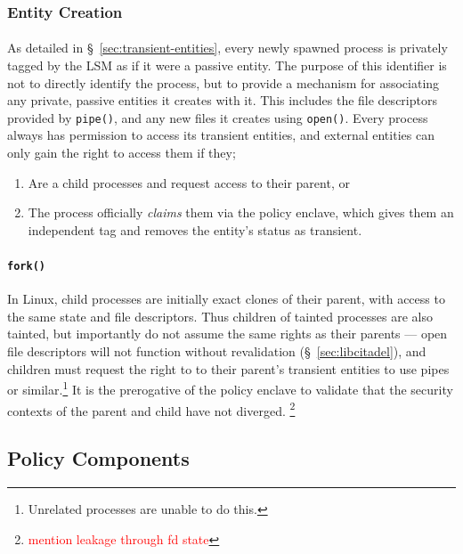 \subsubsection{Entity Creation}
\label{sec:entity-creation}
\paragraph{} As detailed in §~\ref{sec:transient-entities}, every newly spawned process is privately tagged by the LSM as if it were a passive entity. The purpose of this identifier is not to directly identify the process, but to provide a mechanism for associating any private, passive entities it creates with it. This includes the file descriptors provided by \texttt{pipe()}, and any new files it creates using \texttt{open()}. Every process always has permission to access its transient entities, and external entities can only gain the right to access them if they;
\begin{enumerate}
    \item Are a child processes and request access to their parent, or
    \item The process officially \textit{claims} them via the policy enclave, which gives them an independent tag and removes the entity's status as transient. 
\end{enumerate}


\paragraph{\texttt{fork()}} In Linux, child processes are initially exact clones of their parent, with access to the same state and file descriptors. Thus children of tainted processes are also tainted, but importantly do not assume the same rights as their parents --- open file descriptors will not function without revalidation (§~\ref{sec:libcitadel}), and children must request the right to to their parent's transient entities to use pipes or similar.\footnote{Unrelated processes are unable to do this.} It is the prerogative of the policy enclave to validate that the security contexts of the parent and child have not diverged. \footnote{\textcolor{red}{mention leakage through fd state}}





\subsection{Policy Components}
\label{sec:policy-enclave}

